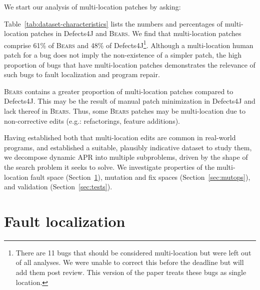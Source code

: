 \documentclass[10pt, conference]{IEEEtran}
\newcommand\bears{\textsc{Bears}\xspace}
\begin{document}
We start our analysis of multi-location patches by asking:

Table~\ref{tab:dataset-characteristics} lists the numbers and percentages of
multi-location patches in Defects4J and \bears. 
We find that multi-location patches comprise 61\% of \bears and 48\% of 
Defects4J\footnote{There are 11 bugs that should be considered multi-location but were left 
out of all analyses. We were unable to correct this before the deadline but will add them 
post review. This version of the paper treats these bugs as single location.}.
Although a multi-location human patch for a bug does not imply the 
non-existence of a simpler patch, the high proportion of bugs that have 
multi-location patches demonstrates the relevance of such bugs to fault localization and
program repair. 

\bears contains a greater proportion of 
multi-location patches compared to Defects4J. This may be the 
result of manual patch minimization in Defects4J
and lack thereof in \bears.
Thus, some \bears patches may be multi-location due to
non-corrective edits (e.g.: refactorings, feature additions).

Having established both that multi-location edits are common in real-world
programs, and established a suitable, plausibly indicative dataset to study
them, we decompose dynamic APR into multiple subproblems, driven by the
shape of the search problem it seeks to solve. We 
investigate properties of the multi-location fault space (Section~\ref{secFL}),
mutation and fix spaces (Section~\ref{sec:mutops}), and validation
(Section~\ref{sec:tests}). 

\section{Fault localization} \label{secFL}

\end{document}
